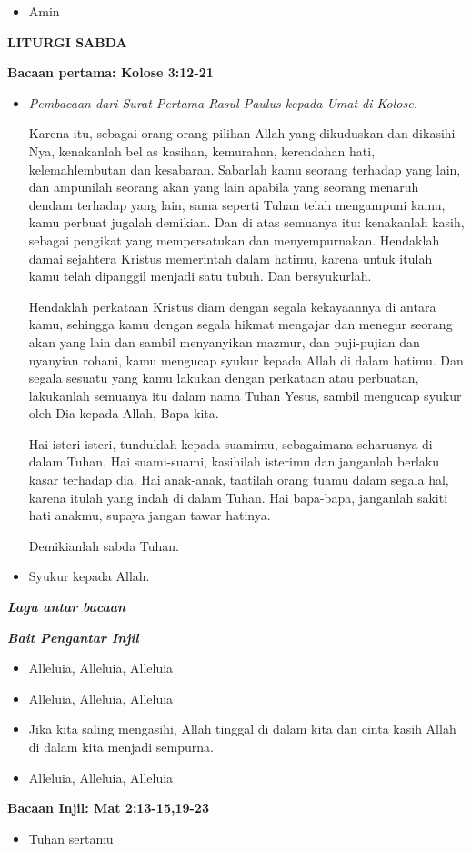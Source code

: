 \documentclass[a5paper,headsepline,titlepage,10pt,normalheadings,DIVcalc]{scrbook}
\makeatletter
\newcommand{\judul}[1]{%
  {\parindent \z@ \centering \normalfont
    \interlinepenalty\@M \Large \bfseries #1\par\nobreak \vskip 20\p@ }}
\newcommand{\subjudul}[1]{%
  {\parindent \z@ \normalfont
    \interlinepenalty\@M \bfseries #1\par\nobreak \vskip 20\p@ }}
\newcommand{\lagu}[1]{%
  {\parindent \z@ \normalfont
    \interlinepenalty\@M \bfseries \emph{#1}\par\nobreak \vskip 20\p@ }}
\newcommand{\BU}[1]{\begin{itemize} \item[U:] #1 \end{itemize}}
\newcommand{\BI}[1]{\begin{itemize} \item[I:] #1 \end{itemize}}
\newcommand{\BP}[1]{\begin{itemize} \item[P:] #1 \end{itemize}}
\makeatother
\begin{document}
\BU{Amin}

\judul{LITURGI SABDA}

\subjudul{Bacaan pertama: Kolose 3:12-21}

\BP{\emph{Pembacaan dari Surat Pertama Rasul Paulus kepada Umat di Kolose.}

Karena itu, sebagai orang-orang pilihan Allah yang dikuduskan dan dikasihi-Nya, kenakanlah bel
as kasihan, kemurahan, kerendahan hati, kelemahlembutan dan kesabaran.
Sabarlah kamu seorang terhadap yang lain, dan ampunilah seorang akan yang lain apabila yang seorang menaruh dendam terhadap yang lain, sama seperti Tuhan telah mengampuni kamu, kamu perbuat jugalah demikian.
Dan di atas semuanya itu: kenakanlah kasih, sebagai pengikat yang mempersatukan dan menyempurnakan.
Hendaklah damai sejahtera Kristus memerintah dalam hatimu, karena untuk itulah kamu telah dipanggil menjadi satu tubuh. Dan bersyukurlah.

Hendaklah perkataan Kristus diam dengan segala kekayaannya di antara kamu, sehingga kamu dengan segala hikmat mengajar dan menegur seorang akan yang lain dan sambil menyanyikan mazmur, dan puji-pujian dan nyanyian rohani, kamu mengucap syukur kepada Allah di dalam hatimu.
Dan segala sesuatu yang kamu lakukan dengan perkataan atau perbuatan, lakukanlah semuanya itu dalam nama Tuhan Yesus, sambil mengucap syukur oleh Dia kepada Allah, Bapa kita.

Hai isteri-isteri, tunduklah kepada suamimu, sebagaimana seharusnya di dalam Tuhan.
Hai suami-suami, kasihilah isterimu dan janganlah berlaku kasar terhadap dia.
Hai anak-anak, taatilah orang tuamu dalam segala hal, karena itulah yang indah di dalam Tuhan.
Hai bapa-bapa, janganlah sakiti hati anakmu, supaya jangan tawar hatinya.

Demikianlah sabda Tuhan.
}

\BU{Syukur kepada Allah.}

\lagu{Lagu antar bacaan}

\lagu{Bait Pengantar Injil}

\BI{Alleluia, Alleluia, Alleluia} 

\BU{Alleluia, Alleluia, Alleluia} 

\BI{Jika kita saling mengasihi, Allah tinggal di dalam kita dan cinta kasih Allah di dalam kita menjadi sempurna.} 
	
\BU{Alleluia, Alleluia, Alleluia} 

\subjudul{Bacaan Injil: Mat 2:13-15,19-23}

\BI{Tuhan sertamu}
\end{document}
